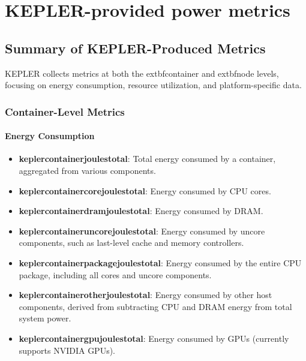 

\chapter{KEPLER-provided power metrics} %

\label{AppendixA} %

\section{Summary of KEPLER-Produced Metrics}

KEPLER collects metrics at both the 	extbf{container} and 	extbf{node} levels, focusing on energy consumption, resource utilization, and platform-specific data.

\subsection{Container-Level Metrics}

\subsubsection{Energy Consumption}
\begin{itemize}
    \item \textbf{kepler\textunderscore container\textunderscore joules\textunderscore total}: Total energy consumed by a container, aggregated from various components.
    \item \textbf{kepler\textunderscore container\textunderscore core\textunderscore joules\textunderscore total}: Energy consumed by CPU cores.
    \item \textbf{kepler\textunderscore container\textunderscore dram\textunderscore joules\textunderscore total}: Energy consumed by DRAM.
    \item \textbf{kepler\textunderscore container\textunderscore uncore\textunderscore joules\textunderscore total}: Energy consumed by uncore components, such as last-level cache and memory controllers.
    \item \textbf{kepler\textunderscore container\textunderscore package\textunderscore joules\textunderscore total}: Energy consumed by the entire CPU package, including all cores and uncore components.
    \item \textbf{kepler\textunderscore container\textunderscore other\textunderscore joules\textunderscore total}: Energy consumed by other host components, derived from subtracting CPU and DRAM energy from total system power.
    \item \textbf{kepler\textunderscore container\textunderscore gpu\textunderscore joules\textunderscore total}: Energy consumed by GPUs (currently supports NVIDIA GPUs).
\end{itemize}

